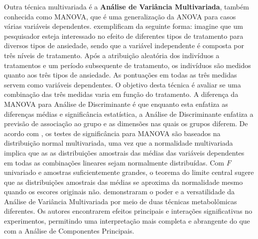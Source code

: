 Outra técnica multivariada é a \textbf{Análise de Variância Multivariada}, também conhecida como MANOVA, que é uma generalização da ANOVA para casos várias variáveis dependentes. \textcite{Tabachnick2013} exemplificam da seguinte forma: imagine que um pesquisador esteja interessado no efeito de diferentes tipos de tratamento para diversos tipos de ansiedade, sendo que a variável independente é composta por três níveis de tratamento. Após a atribuição aleatória dos indivíduos a tratamentos e um período subsequente de tratamento, os indivíduos são medidos quanto aos três tipos de ansiedade. As pontuações em todas as três medidas servem como variáveis dependentes. O objetivo desta técnica é avaliar se uma combinação das três medidas varia em função do tratamento. A diferença da MANOVA para Análise de Discriminante é que enquanto esta enfatiza as diferenças médias e significância estatística, a Análise de Discriminante enfatiza a previsão de associação ao grupo e as dimensões nas quais os grupos diferem. De acordo com \textcite{Tabachnick2013}, os testes de significância para MANOVA são baseados na distribuição normal multivariada, uma vez que a normalidade multivariada implica que as as distribuições amostrais das médias das variáveis dependentes em todas as combinações lineares sejam normalmente distribuídas. Com $F$ univariado e amostras suficientemente grandes, o teorema do limite central sugere que as distribuições amostrais das médias se aproxima da normalidade mesmo quando os escores originais não. \textcite{Johnson2007} demonstraram o poder e a versatilidade da Análise de Variância Multivariada por meio de duas técnicas metabolômicas diferentes. Os autores encontrarem efeitos principais e interações significativas no experimentos, permitindo uma interpretação mais completa e abrangente do que com a Análise de Componentes Principais.


